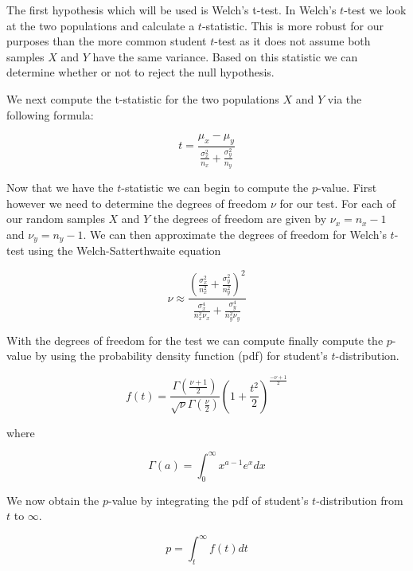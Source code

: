 The first hypothesis which will be used is Welch's t-test\cite{welch_generalization_1947}. In Welch's $t$-test we look at the two populations and calculate a $t$-statistic. This is more robust for our purposes than the more common student $t$-test as it does not assume both samples $X$ and $Y$ have the same variance. Based on this statistic we can determine whether or not to reject the null hypothesis.  

We next compute the t-statistic for the two populations $X$ and $Y$ via the following formula:

	 \begin{equation}\label{t-stat}
		t = \frac{  \mu_x - \mu_y }{ \frac{\sigma_{x}^2}{n_x} + \frac{\sigma_{y}^2}{n_y}   }
	 \end{equation}

Now that we have the $t$-statistic we can begin to compute the $p$-value. First however we need to determine the degrees of freedom $\nu$ for our test. For each of our random samples $X$ and $Y$ the degrees of freedom are given by $\nu_x = n_x -1$ and $\nu_y = n_y-1$. We can then approximate the degrees of freedom for Welch's $t$-test using the Welch-Satterthwaite equation ~\cite{satterthwaite1946approximate,welch_generalization_1947}

	\begin{equation}\label{tTestDegrees}
		\nu \approx \frac{ (\frac{\sigma_{x}^2}{n_{x}^2}+\frac{\sigma_{y}^2}{n_{y}^2})^2 }{\frac{\sigma_{x}^4}{n_{x}^2 \nu_x}+\frac{\sigma_{y}^4}{n_{y}^2 \nu_y}}
	\end{equation}

With the degrees of freedom for the test we can compute finally compute the $p$-value by using the probability density function (pdf) for student's $t$-distribution. 

\begin{equation}\label{tTestPDF}
	f(t)=\frac{\Gamma(\frac{\nu+1}{2})}{\sqrt{\nu}\Gamma(\frac{\nu}{2})}(1+\frac{t^2}{2})^{\frac{-\nu+1}{2}}
\end{equation}

where 

\begin{equation}\label{Gamma}
	\Gamma(a) = \int_{0}^{\infty} x^{a-1}e^{x}dx
\end{equation}

We now obtain the $p$-value by integrating the pdf of student's $t$-distribution from $t$ to $\infty$. 

\begin{equation}\label{pvalStudentTest}
	p=\int_{t}^{\infty}f(t)dt 
\end{equation}

